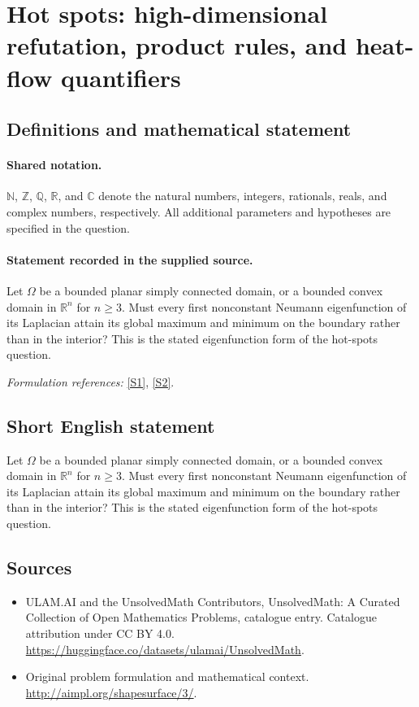 \documentclass[11pt]{article}
\newcommand{\sref}[2]{\hyperlink{source:#1:#2}{[S#2]}}
\begin{document}
\section{Hot spots: high-dimensional refutation, product rules, and heat-flow quantifiers}\label{statement}

\subsection{Definitions and mathematical statement}

\paragraph{Shared notation.}$\mathbb N$, $\mathbb Z$, $\mathbb Q$, $\mathbb R$, and $\mathbb C$ denote the natural numbers, integers, rationals, reals, and complex numbers, respectively. All additional parameters and hypotheses are specified in the question.


\paragraph{Statement recorded in the supplied source.}
Let $\Omega$ be a bounded planar simply connected domain, or a bounded convex domain in $\mathbb R^n$ for $n\geq3$. Must every first nonconstant Neumann eigenfunction of its Laplacian attain its global maximum and minimum on the boundary rather than in the interior? This is the stated eigenfunction form of the hot-spots question.
\par\smallskip\textit{Formulation references:} \sref{statement}{1}, \sref{statement}{2}.
\subsection{Short English statement}
Let $\Omega$ be a bounded planar simply connected domain, or a bounded convex domain in $\mathbb R^n$ for $n\geq3$. Must every first nonconstant Neumann eigenfunction of its Laplacian attain its global maximum and minimum on the boundary rather than in the interior? This is the stated eigenfunction form of the hot-spots question.
\subsection{Sources}
\begin{itemize}
\item[\hypertarget{source:statement:1}{S1}] ULAM.AI and the UnsolvedMath Contributors, UnsolvedMath: A Curated Collection of Open Mathematics Problems, catalogue entry. Catalogue attribution under CC BY 4.0.
\url{https://huggingface.co/datasets/ulamai/UnsolvedMath}.
\item[\hypertarget{source:statement:2}{S2}] Original problem formulation and mathematical context.
\url{http://aimpl.org/shapesurface/3/}.
\end{itemize}
\label{end:statement}
\end{document}
